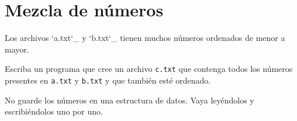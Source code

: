 \section{Mezcla de números}

Los archivos `a.txt`\_ y `b.txt`\_ tienen muchos números ordenados de
menor a mayor.

Escriba un programa que cree un archivo \lstinline!c.txt! que contenga
todos los números presentes en \lstinline!a.txt! y \lstinline!b.txt! y
que también esté ordenado.

No guarde los números en una estructura de datos. Vaya leyéndolos y
escribiéndolos uno por uno.
